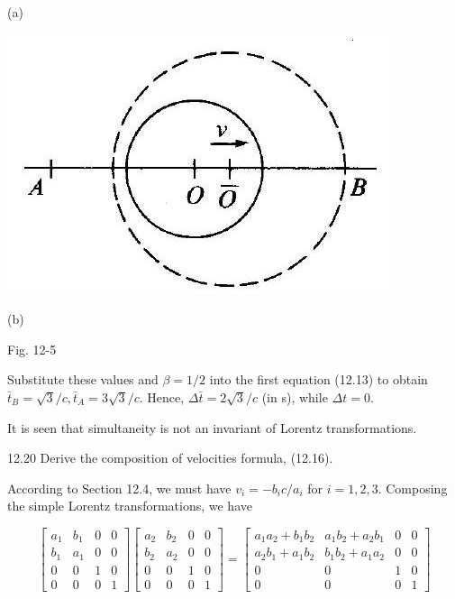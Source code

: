 \documentclass[10pt]{article}
\begin{document}
(a)

\begin{center}
\includegraphics[max width=\textwidth]{2024_04_03_41f90be4f896e21f0dc9g-189(1)}
\end{center}

(b)

Fig. 12-5

Substitute these values and $\beta=1 / 2$ into the first equation (12.13) to obtain $\bar{t}_{B}=\sqrt{3} / c, \bar{t}_{A}=3 \sqrt{3} / c$. Hence, $\Delta \bar{t}=2 \sqrt{3} / c$ (in s), while $\Delta t=0$.

It is seen that simultaneity is not an invariant of Lorentz transformations.

12.20 Derive the composition of velocities formula, (12.16).

According to Section 12.4, we must have $v_{i}=-b_{i} c / a_{i}$ for $i=1,2,3$. Composing the simple Lorentz transformations, we have

$$
\left[\begin{array}{cccc}
a_{1} & b_{1} & 0 & 0 \\
b_{1} & a_{1} & 0 & 0 \\
0 & 0 & 1 & 0 \\
0 & 0 & 0 & 1
\end{array}\right]\left[\begin{array}{cccc}
a_{2} & b_{2} & 0 & 0 \\
b_{2} & a_{2} & 0 & 0 \\
0 & 0 & 1 & 0 \\
0 & 0 & 0 & 1
\end{array}\right]=\left[\begin{array}{cccc}
a_{1} a_{2}+b_{1} b_{2} & a_{1} b_{2}+a_{2} b_{1} & 0 & 0 \\
a_{2} b_{1}+a_{1} b_{2} & b_{1} b_{2}+a_{1} a_{2} & 0 & 0 \\
0 & 0 & 1 & 0 \\
0 & 0 & 0 & 1
\end{array}\right]
$$
\end{document}
